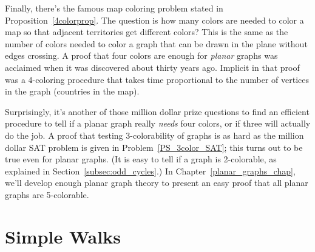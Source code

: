 Finally, there's the famous map coloring problem stated in
Proposition~\ref{4colorprop}.  The question is how many colors are
needed to color a map so that adjacent territories get different
colors?  This is the same as the number of colors needed to color a
graph that can be drawn in the plane without edges crossing.  A proof
that four colors are enough for  \emph{planar}
graphs was acclaimed when it was discovered about thirty years ago.
Implicit in that proof was a 4-coloring procedure that takes time
proportional to the number of vertices in the graph (countries in the
map).

Surprisingly, it's another of those million dollar prize questions to
find an efficient procedure to tell if a planar graph really
\emph{needs} four colors, or if three will actually do the job.  A
proof that testing 3-colorability of graphs is as hard as the million
dollar SAT problem is given in Problem~\ref{PS_3color_SAT}; this turns
out to be true even for planar graphs.  (It is easy to tell if a graph
is 2-colorable, as explained in Section~\ref{subsec:odd_cycles}.)  In
Chapter~\ref{planar_graphs_chap}, we'll develop enough planar graph
theory to present an easy proof that all planar graphs are
5-colorable.

\iffalse
Planarity is another property with important colorability consequences.
The famous 4-Color Theorem says that every planar graph is 4-colorable.
This is a hard result to prove, but we will come close in
Chapter~\ref{planar_graphs_chap} where we define planar graphs and prove
that they are 5-colorable.
\fi

\begin{problems}

\classproblems
{}

\homeworkproblems
{}

\examproblems
{}

\end{problems}



\section{Simple Walks}\label{sec:connectedness}

